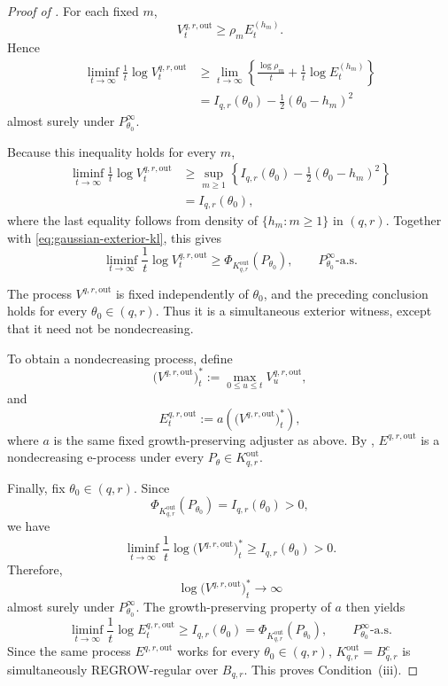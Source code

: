 \documentclass[12pt]{article}
\theoremstyle{spaced}
\theoremstyle{remark}
\begin{document}
\begin{proof}[Proof of ]
For each fixed $m$,
\[
    V_t^{q,r,\mathrm{out}}
    \ge
    \rho_m E_t^{(h_m)}.
\]
Hence
\begin{align*}
    \liminf_{t\to\infty}
    \frac1t
    \log V_t^{q,r,\mathrm{out}}
    &\ge
    \lim_{t\to\infty}
    \left\{
        \frac{\log\rho_m}{t}
        +
        \frac1t\log E_t^{(h_m)}
    \right\}\\
    &=
    I_{q,r}(\theta_0)
    -
    \frac12(\theta_0-h_m)^2
\end{align*}
almost surely under $P_{\theta_0}^\infty$.

Because this inequality holds for every $m$,
\[
\begin{aligned}
    \liminf_{t\to\infty}
    \frac1t
    \log V_t^{q,r,\mathrm{out}}
    &\ge
    \sup_{m\ge1}
    \left\{
        I_{q,r}(\theta_0)
        -
        \frac12(\theta_0-h_m)^2
    \right\}\\
    &=
    I_{q,r}(\theta_0),
\end{aligned}
\]
where the last equality follows from density of
$\{h_m:m\ge1\}$ in $(q,r)$. Together with
\eqref{eq:gaussian-exterior-kl}, this gives
\[
    \liminf_{t\to\infty}
    \frac1t
    \log V_t^{q,r,\mathrm{out}}
    \ge
    \Phi_{K_{q,r}^{\mathrm{out}}}(P_{\theta_0}),
    \qquad
    P_{\theta_0}^\infty\text{-a.s.}
\]

The process $V^{q,r,\mathrm{out}}$ is fixed independently of
$\theta_0$, and the preceding conclusion holds for every
$\theta_0\in(q,r)$. Thus it is a simultaneous exterior witness,
except that it need not be nondecreasing.

To obtain a nondecreasing process, define
\[
    \bigl(V^{q,r,\mathrm{out}}\bigr)_t^*
    :=
    \max_{0\le u\le t}
    V_u^{q,r,\mathrm{out}},
\]
and
\[
    E_t^{q,r,\mathrm{out}}
    :=
    a\left(
        \bigl(V^{q,r,\mathrm{out}}\bigr)_t^*
    \right),
\]
where $a$ is the same fixed growth-preserving adjuster as above.
By ,
$E^{q,r,\mathrm{out}}$ is a nondecreasing e-process under every
$P_\theta\in K_{q,r}^{\mathrm{out}}$.

Finally, fix $\theta_0\in(q,r)$. Since
\[
    \Phi_{K_{q,r}^{\mathrm{out}}}(P_{\theta_0})
    =
    I_{q,r}(\theta_0)
    >0,
\]
we have
\[
    \liminf_{t\to\infty}
    \frac1t
    \log
    \bigl(V^{q,r,\mathrm{out}}\bigr)_t^*
    \ge
    I_{q,r}(\theta_0)>0.
\]
Therefore,
\[
    \log
    \bigl(V^{q,r,\mathrm{out}}\bigr)_t^*
    \longrightarrow\infty
\]
almost surely under $P_{\theta_0}^\infty$. The
growth-preserving property of $a$ then yields
\[
    \liminf_{t\to\infty}
    \frac1t
    \log E_t^{q,r,\mathrm{out}}
    \ge
    I_{q,r}(\theta_0)
    =
    \Phi_{K_{q,r}^{\mathrm{out}}}(P_{\theta_0}),
    \qquad
    P_{\theta_0}^\infty\text{-a.s.}
\]
Since the same process $E^{q,r,\mathrm{out}}$ works for every
$\theta_0\in(q,r)$,
$K_{q,r}^{\mathrm{out}}=B_{q,r}^c$ is simultaneously
REGROW-regular over $B_{q,r}$. This proves
Condition~\textup{(iii)}.


\end{proof}
\end{document}
